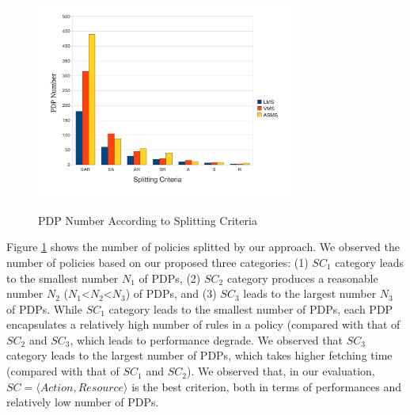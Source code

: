 \begin{figure}[!h]
  \centering
\includegraphics[width=8.5cm, height=7.2cm]{pdpnumber.pdf}
\begin{center}
\caption{PDP Number According to Splitting Criteria}
\label{pdpnumber}
\end{center}
\end{figure}
Figure \ref{pdpnumber} shows the number of policies splitted by our approach. 
We observed the number of policies based on our proposed three categories: (1) $SC_{1}$ category leads to the smallest number $N_1$ of PDPs, (2) $SC_{2}$ category produces a reasonable number $N_2$ ($N_1$<$N_2$<$N_3$) of PDPs, and (3) $SC_{3}$ leads to the largest number $N_3$ of PDPs.
While $SC_{1}$ category leads to the smallest number of PDPs, each PDP encapsulates a relatively high number of rules in a policy (compared
with that of $SC_{2}$ and $SC_{3}$, which leads to performance degrade. We observed that $SC_{3}$ category leads to the largest number of PDPs, which takes higher fetching time (compared with that of $SC_{1}$ and $SC_{2}$). 
We observed that, in our evaluation, $SC=\langle Action, Resource\rangle$ is the best criterion, both in terms of performances and relatively low number of PDPs.




